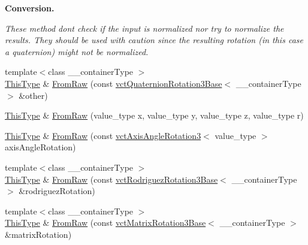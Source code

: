 \begin{Indent}{\bf Conversion.}\par
{\em These method don\textquotesingle{}t check if the input is normalized nor try to normalize the results. They should be used with caution since the resulting rotation (in this case a quaternion) might not be normalized. }\begin{DoxyCompactItemize}
\item 
{\footnotesize template$<$class \+\_\+\+\_\+container\+Type $>$ }\\\hyperlink{classvct_quaternion_base_af28efdc38acf89acb7a67afada11408c}{This\+Type} \& \hyperlink{classvct_quaternion_rotation3_base_a6056404ea3fd12de1172be30ff2d5064}{From\+Raw} (const \hyperlink{classvct_quaternion_rotation3_base}{vct\+Quaternion\+Rotation3\+Base}$<$ \+\_\+\+\_\+container\+Type $>$ \&other)
\item 
\hyperlink{classvct_quaternion_base_af28efdc38acf89acb7a67afada11408c}{This\+Type} \& \hyperlink{classvct_quaternion_rotation3_base_aef7dd99f9111582ac3d9ccd6f6891c66}{From\+Raw} (value\+\_\+type x, value\+\_\+type y, value\+\_\+type z, value\+\_\+type r)
\item 
\hyperlink{classvct_quaternion_base_af28efdc38acf89acb7a67afada11408c}{This\+Type} \& \hyperlink{classvct_quaternion_rotation3_base_a6c8fa55dfd467386b467538d67916c41}{From\+Raw} (const \hyperlink{classvct_axis_angle_rotation3}{vct\+Axis\+Angle\+Rotation3}$<$ value\+\_\+type $>$ axis\+Angle\+Rotation)
\item 
{\footnotesize template$<$class \+\_\+\+\_\+container\+Type $>$ }\\\hyperlink{classvct_quaternion_base_af28efdc38acf89acb7a67afada11408c}{This\+Type} \& \hyperlink{classvct_quaternion_rotation3_base_ad820f69c1146537f1a2180008cff7905}{From\+Raw} (const \hyperlink{classvct_rodriguez_rotation3_base}{vct\+Rodriguez\+Rotation3\+Base}$<$ \+\_\+\+\_\+container\+Type $>$ \&rodriguez\+Rotation)
\item 
{\footnotesize template$<$class \+\_\+\+\_\+container\+Type $>$ }\\\hyperlink{classvct_quaternion_base_af28efdc38acf89acb7a67afada11408c}{This\+Type} \& \hyperlink{classvct_quaternion_rotation3_base_a477d0734a51969199fc5b781e64d9554}{From\+Raw} (const \hyperlink{classvct_matrix_rotation3_base}{vct\+Matrix\+Rotation3\+Base}$<$ \+\_\+\+\_\+container\+Type $>$ \&matrix\+Rotation)
\end{DoxyCompactItemize}
\end{Indent}
